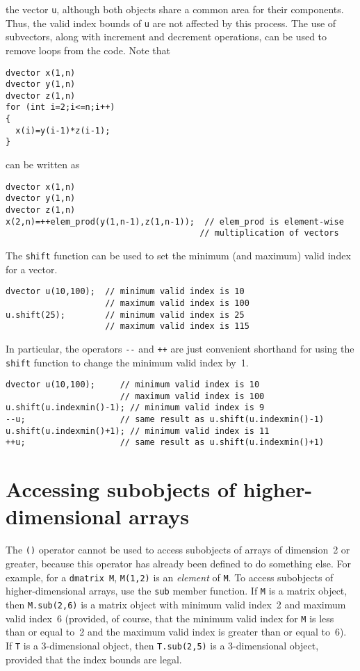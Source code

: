 the vector \texttt{u}, although both objects share a common area for their
components. Thus, the valid index bounds of \texttt{u} are not
affected by this process.  
The use of subvectors, along with increment and decrement
operations, can be used to remove loops from the code. Note that
\begin{lstlisting}
dvector x(1,n)
dvector y(1,n)
dvector z(1,n)
for (int i=2;i<=n;i++)
{
  x(i)=y(i-1)*z(i-1);
}
\end{lstlisting}
can be written as
\begin{lstlisting}
dvector x(1,n)
dvector y(1,n)
dvector z(1,n)
x(2,n)=++elem_prod(y(1,n-1),z(1,n-1));  // elem_prod is element-wise 
                                       // multiplication of vectors
\end{lstlisting}

The \texttt{shift} function can be used to set the minimum (and maximum)
valid index for a vector.
\begin{lstlisting}
dvector u(10,100);  // minimum valid index is 10
                    // maximum valid index is 100
u.shift(25);        // minimum valid index is 25
                    // maximum valid index is 115
\end{lstlisting}
In particular, the operators \texttt{-{}-} and \texttt{++}
are just convenient shorthand for using the \texttt{shift}
function to change the minimum valid index by~1.
\begin{lstlisting}
dvector u(10,100);     // minimum valid index is 10
                       // maximum valid index is 100
u.shift(u.indexmin()-1); // minimum valid index is 9
--u;                   // same result as u.shift(u.indexmin()-1) 
u.shift(u.indexmin()+1); // minimum valid index is 11
++u;                   // same result as u.shift(u.indexmin()+1) 
\end{lstlisting}
 


\section{Accessing subobjects of higher-dimensional arrays}

The  \texttt{()} operator cannot be used to access subobjects of
arrays of dimension~2 or greater, because this operator has
already been defined to do something else. For example,
for a \texttt{dmatrix M}, \texttt{M(1,2)} is an {\it element}
of \texttt{M}.  To access subobjects of higher-dimensional arrays,
use the \texttt{sub} member function. If \texttt{M} is a matrix object,
then \texttt{M.sub(2,6)} is a matrix object with minimum valid
index~2 and maximum valid index~6 (provided, of course, that the
minimum valid index for \texttt{M} is less than or equal to~2 and
the maximum valid index is greater than or equal to~6).
If \texttt{T} is a 3-dimensional object, then
\texttt{T.sub(2,5)} is a 3-dimensional object, provided that
the index bounds are legal. 


